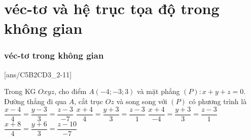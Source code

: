 \part{véc-tơ và hệ trục tọa độ trong không gian}
\section{véc-tơ trong không gian}
[ans/C5B2CD3_2-11]
\TN
\begin{ex}%
	Trong KG $Oxyz$, cho điểm $A(-4;-3;3)$ và mặt phẳng $(P)\colon x+y+z=0$. Đường thẳng đi qua $A$, cắt trục $Oz$ và song song với $(P)$ có phương trình là
	\choice
	{$\dfrac{x-4}{4}=\dfrac{y-3}{3}=\dfrac{z-3}{-7}$}
	{$\dfrac{x+4}{4}=\dfrac{y+3}{3}=\dfrac{z-3}{1}$}
	{$\dfrac{x+4}{-4}=\dfrac{y+3}{3}=\dfrac{z-3}{1}$}
	{\True $\dfrac{x+8}{4}=\dfrac{y+6}{3}=\dfrac{z-10}{-7}$}
\end{ex}	
